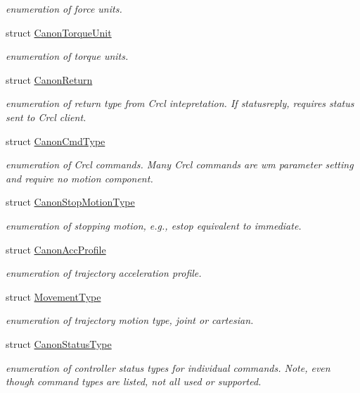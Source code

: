 \begin{DoxyCompactItemize}
\begin{DoxyCompactList}\small\item\em enumeration of force units. \end{DoxyCompactList}\item 
struct \hyperlink{structRCS_1_1CanonTorqueUnit}{Canon\-Torque\-Unit}
\begin{DoxyCompactList}\small\item\em enumeration of torque units. \end{DoxyCompactList}\item 
struct \hyperlink{structRCS_1_1CanonReturn}{Canon\-Return}
\begin{DoxyCompactList}\small\item\em enumeration of return type from Crcl intepretation. If statusreply, requires status sent to Crcl client. \end{DoxyCompactList}\item 
struct \hyperlink{structRCS_1_1CanonCmdType}{Canon\-Cmd\-Type}
\begin{DoxyCompactList}\small\item\em enumeration of Crcl commands. Many Crcl commands are wm parameter setting and require no motion component. \end{DoxyCompactList}\item 
struct \hyperlink{structRCS_1_1CanonStopMotionType}{Canon\-Stop\-Motion\-Type}
\begin{DoxyCompactList}\small\item\em enumeration of stopping motion, e.\-g., estop equivalent to immediate. \end{DoxyCompactList}\item 
struct \hyperlink{structRCS_1_1CanonAccProfile}{Canon\-Acc\-Profile}
\begin{DoxyCompactList}\small\item\em enumeration of trajectory acceleration profile. \end{DoxyCompactList}\item 
struct \hyperlink{structRCS_1_1MovementType}{Movement\-Type}
\begin{DoxyCompactList}\small\item\em enumeration of trajectory motion type, joint or cartesian. \end{DoxyCompactList}\item 
struct \hyperlink{structRCS_1_1CanonStatusType}{Canon\-Status\-Type}
\begin{DoxyCompactList}\small\item\em enumeration of controller status types for individual commands. Note, even though command types are listed, not all used or supported. \end{DoxyCompactList}\item 

\end{DoxyCompactItemize}
